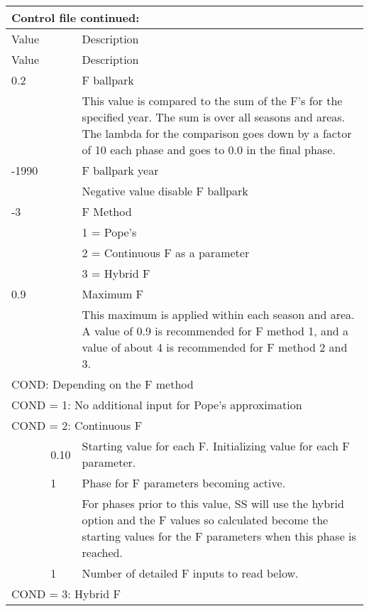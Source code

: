 \begin{center}
		\begin{longtable}{p{1cm} p{3cm} p{11cm}}
			\multicolumn{3}{l}{Control file continued:}\\
			\hline
			Value &   &  Description\\
			\hline
			\endfirsthead

			\hline
			Value &  &  Description\\
			\hline
			\endhead

			\endfoot
			\endlastfoot

			0.2 & & F ballpark\\
			    & & This value is compared to the sum of the F’s for the specified year.  The sum is over all seasons and areas.  The lambda for the comparison goes down by a factor of 10 each phase and goes to 0.0 in the final phase.\\
		   \hline
			-1990 & & F ballpark year \\
			      & & Negative value disable F ballpark \\
		   \hline
			-3  & & F Method \\
			    & & 1 = Pope's \\
			    & & 2 = Continuous F as a parameter \\
			    & & 3 = Hybrid F \\
		   \hline
		   0.9 & & Maximum F \\
		       & & This maximum is applied within each season and area.   A value of 0.9 is recommended for F method 1, and a value of about 4 is recommended for F method 2 and 3. \\
		   \hline
		   \multicolumn{3}{l}{COND: Depending on the F method} \\
		   \hline
		   \multicolumn{3}{l}{COND = 1: No additional input for Pope's approximation}\\
		   \hline
		   \multicolumn{3}{l}{COND = 2: Continuous F}\\
		   & 0.10 & Starting value for each F.  Initializing value for each F parameter.\\
		   & 1 & Phase for F parameters becoming active.  \\
		   &   & For phases prior to this value,  SS will use the hybrid option and the F values so calculated become the starting values for the F parameters when this phase is reached.\\
		   & 1 & Number of detailed F inputs to read below. \\
		   \hline
		   \multicolumn{3}{l}{COND = 3: Hybrid F}\\

\end{longtable}
\end{center}

